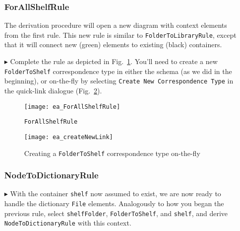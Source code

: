 \begin{itemize}
\newpage

\subsubsection{ForAllShelfRule} %

The derivation procedure will open a new diagram with context elements from the first rule. This new rule is similar to
\texttt{Fold\-er\-To\-Lib\-rar\-y\-Rule}, except that it will connect new (green) elements to existing (black) containers. 

\item[$\blacktriangleright$] Complete the rule as depicted in Fig.~\ref{ea:ForAllShelves_Complete}. You'll need to create a new \texttt{FolderToShelf}
correspondence type in either the schema (as we did in the beginning), or on-the-fly by selecting \texttt{Create New Correspondence Type} in the quick-link
dialogue (Fig.~\ref{ea:corrOnTheFly}).

\begin{figure}[htbp]
\begin{center}
  \texttt{[image: ea\_ForAllShelfRule]}
  \caption{\texttt{ForAllShelfRule}}
  \label{ea:ForAllShelves_Complete}
\end{center}
\end{figure}

\begin{figure}[htbp]
\begin{center}
  \texttt{[image: ea\_createNewLink]}
  \caption{Creating a \texttt{FolderToShelf} correspondence type on-the-fly}
  \label{ea:corrOnTheFly}
\end{center}
\end{figure}

\subsubsection{NodeToDictionaryRule} %

\item[$\blacktriangleright$] With the container \texttt{shelf} now assumed to exist, we are now ready to handle the dictionary \texttt{File} elements.
Analogously to how you began the previous rule, select \texttt{shelfFolder}, \texttt{FolderToShelf}, and \texttt{shelf}, and derive
\texttt{NodeToDictionaryRule} with this context.

\vspace{0.5cm}


\end{itemize}
